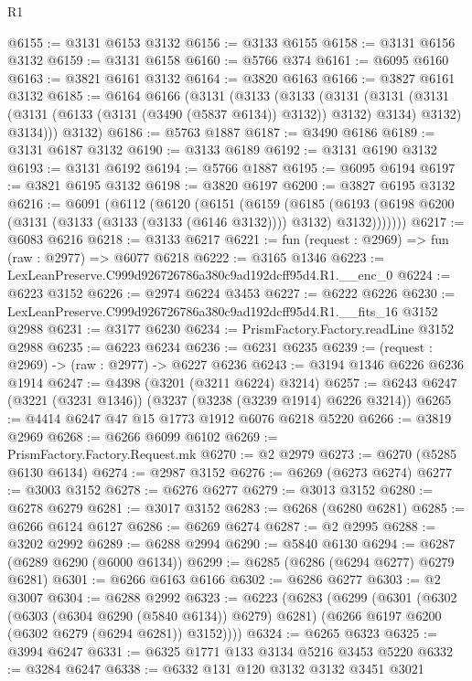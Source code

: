 \begin{lexlean}{R1}
\begin{coremodule}
@6155 := @3131 @6153 @3132
@6156 := @3133 @6155
@6158 := @3131 @6156 @3132
@6159 := @3131 @6158
@6160 := @5766 @374
@6161 := @6095 @6160
@6163 := @3821 @6161 @3132
@6164 := @3820 @6163
@6166 := @3827 @6161 @3132
@6185 := @6164
    @6166
    (@3131
      (@3133
        (@3133
          (@3131
            (@3131 (@3131 (@3131 (@6133 (@3131 (@3490 (@5837 @6134)) @3132)) @3132) @3134) @3132)
            @3134)))
      @3132)
@6186 := @5763 @1887
@6187 := @3490 @6186
@6189 := @3131 @6187 @3132
@6190 := @3133 @6189
@6192 := @3131 @6190 @3132
@6193 := @3131 @6192
@6194 := @5766 @1887
@6195 := @6095 @6194
@6197 := @3821 @6195 @3132
@6198 := @3820 @6197
@6200 := @3827 @6195 @3132
@6216 := @6091
    (@6112
      (@6120
        (@6151
          (@6159
            (@6185
              (@6193 (@6198 @6200 (@3131 (@3133 (@3133 (@3133 (@6146 @3132)))) @3132) @3132)))))))
@6217 := @6083 @6216
@6218 := @3133 @6217
@6221 := fun (request : @2969) => fun (raw : @2977) => @6077 @6218
@6222 := @3165 @1346
@6223 := LexLeanPreserve.C999d926726786a380c9ad192dcff95d4.R1.__enc_0
@6224 := @6223 @3152
@6226 := @2974 @6224 @3453
@6227 := @6222 @6226
@6230 := LexLeanPreserve.C999d926726786a380c9ad192dcff95d4.R1.__fits_16 @3152 @2988
@6231 := @3177 @6230
@6234 := PrismFactory.Factory.readLine @3152 @2988
@6235 := @6223 @6234
@6236 := @6231 @6235
@6239 := (request : @2969) -> (raw : @2977) -> @6227 @6236
@6243 := @3194 @1346 @6226 @6236 @1914
@6247 := @4398 (@3201 (@3211 @6224) @3214)
@6257 := @6243 @6247 (@3221 (@3231 @1346)) (@3237 (@3238 (@3239 @1914) @6226 @3214))
@6265 := @4414 @6247 @47 @15 @1773 @1912 @6076 @6218 @5220
@6266 := @3819 @2969
@6268 := @6266 @6099 @6102
@6269 := PrismFactory.Factory.Request.mk
@6270 := @2 @2979
@6273 := @6270 (@5285 @6130 @6134)
@6274 := @2987 @3152
@6276 := @6269 (@6273 @6274)
@6277 := @3003 @3152
@6278 := @6276 @6277
@6279 := @3013 @3152
@6280 := @6278 @6279
@6281 := @3017 @3152
@6283 := @6268 (@6280 @6281)
@6285 := @6266 @6124 @6127
@6286 := @6269 @6274
@6287 := @2 @2995
@6288 := @3202 @2992
@6289 := @6288 @2994
@6290 := @5840 @6130
@6294 := @6287 (@6289 @6290 (@6000 @6134))
@6299 := @6285 (@6286 (@6294 @6277) @6279 @6281)
@6301 := @6266 @6163 @6166
@6302 := @6286 @6277
@6303 := @2 @3007
@6304 := @6288 @2992
@6323 := @6223
    (@6283
      (@6299
        (@6301
          (@6302 (@6303 (@6304 @6290 (@5840 @6134)) @6279) @6281)
          (@6266 @6197 @6200 (@6302 @6279 (@6294 @6281)) @3152))))
@6324 := @6265 @6323
@6325 := @3994 @6247
@6331 := @6325 @1771 @133 @3134 @5216 @3453 @5220
@6332 := @3284 @6247
@6338 := @6332 @131 @120 @3132 @3132 @3451 @3021

\end{coremodule}
\end{lexlean}
